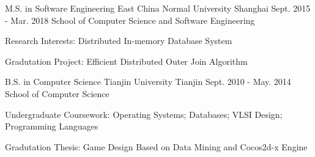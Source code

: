 \begin{cventries}
  \cventry
    {M.S. in Software Engineering}
    {East China Normal University}
    {Shanghai}
    {Sept. 2015 - Mar. 2018}
    {School of Computer Science and Software Engineering}
    {
      \begin{cvitems}
        \item {Research Interests: Distributed In-memory Database System}
        \item {Gradutation Project: Efficient Distributed Outer Join Algorithm}
      \end{cvitems}
    }
    \cventry
    {B.S. in Computer Science}
    {Tianjin University}
    {Tianjin}
    {Sept. 2010 - May. 2014}
    {School of Computer Science}
    {
      \begin{cvitems}
        \item {Undergraduate Coursework: Operating Systems; Databases; VLSI Design; Programming Languages}
        \item {Gradutation Thesis: Game Design Based on Data Mining and Cocos2d-x Engine}
      \end{cvitems}
    }
\end{cventries}
